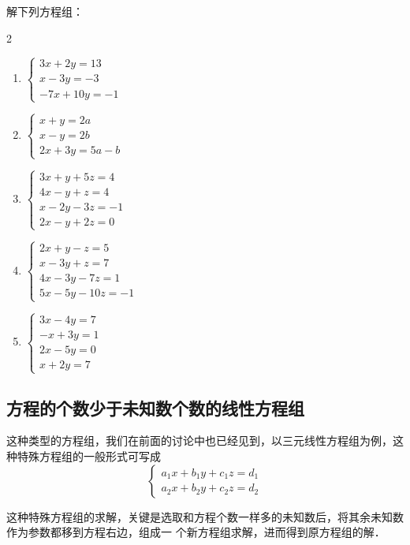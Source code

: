 \begin{ex}
解下列方程组：
\begin{multicols}{2}
\begin{enumerate}
\item  $\begin{cases}
    3 x+2 y=13 \\ x-3 y=-3 \\ -7 x+10 y=-1 
\end{cases}$
\item $\begin{cases}x+y=2 a \\ x-y=2 b \\ 2 x+3 y=5 a-b\end{cases}$
    \item $\begin{cases}3 x+y+5 z=4 \\ 4 x-y+z=4 \\ x-2 y-3 z=-1 \\ 2 x-y+2 z=0\end{cases}$
        \item $\begin{cases}2 x+y-z=5 \\ x-3 y+z=7 \\ 4 x-3 y-7 z=1 \\ 5 x-5 y-10 z=-1\end{cases}$
            \item $\begin{cases}3 x-4 y=7 \\ -x+3 y=1 \\ 2 x-5 y=0 \\ x+2 y=7\end{cases}$
\end{enumerate}
\end{multicols}
\end{ex}

\subsection{方程的个数少于未知数个数的线性方程组}
这种类型的方程组，我们在前面的讨论中也已经见到，以三元线性方程组为例，这种特殊方程组的一般形式可写成
\[\begin{cases}
    a_1x+b_1y+c_1z=d_1\\
    a_2x+b_2y+c_2z=d_2
\end{cases}\]

这种特殊方程组的求解，关键是选取和方程个数一样多的未知数后，将其余未知数作为参数都移到方程右边，组成一
个新方程组求解，进而得到原方程组的解．

